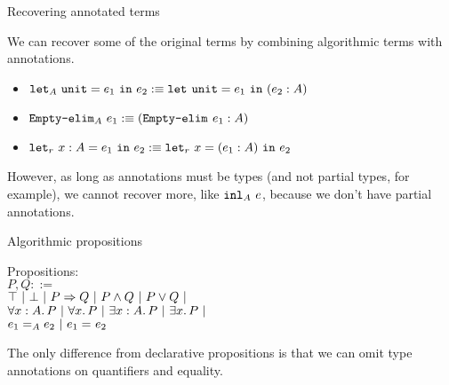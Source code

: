 \begin{frame}{Recovering annotated terms}

We can recover some of the original terms by combining algorithmic terms with annotations.

\begin{itemize}
  \item $\unitelim{e_1}{e_2}[A] :\equiv \unitelim{e_1}{\annot{e_2}{A}}$
  \item $\emptyelim{e_1}[A] :\equiv \annot{\emptyelim{e_1}}{A}$
  \item $\letin[r]{x}[A]{e_1}{e_2} :\equiv \letin[r]{x}{\annot{e_1}{A}}{e_2}$
\end{itemize}

\vspace{2em}

However, as long as annotations must be types (and not partial types, for example), we cannot recover more, like $\inl[A]{e}$, because we don't have partial annotations.

\end{frame}

\begin{frame}{Algorithmic propositions}

Propositions: \\
$P, Q ::=$ \\
\qquad $\top \ |\  \bot \ |\  P \Rightarrow Q \ |\  P \land Q \ |\  P \lor Q \ |\ $ \\
\qquad $\All{x}[A]{P} \pipe \All{x}{P} \pipe \Ex{x}[A]{P} \pipe \Ex{x}{P} \pipe$ \\
\qquad $\Eq[A]{e_1}{e_2} \pipe \Eq{e_1}{e_2}$

\vspace{2em}

The only difference from declarative propositions is that we can omit type annotations on quantifiers and equality.

\end{frame}

